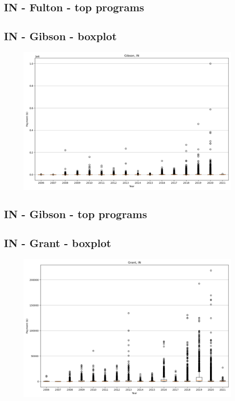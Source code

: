 \subsection*{IN - Fulton - top programs}

\newpage
\subsection*{IN - Gibson - boxplot}
\begin{figure}[h]
\centering
\includegraphics[width=7in]{../output/boxplots/counties/Gibson-IN_boxplot.png}
\end{figure}


\subsection*{IN - Gibson - top programs}

\newpage
\subsection*{IN - Grant - boxplot}
\begin{figure}[h]
\centering
\includegraphics[width=7in]{../output/boxplots/counties/Grant-IN_boxplot.png}
\end{figure}


